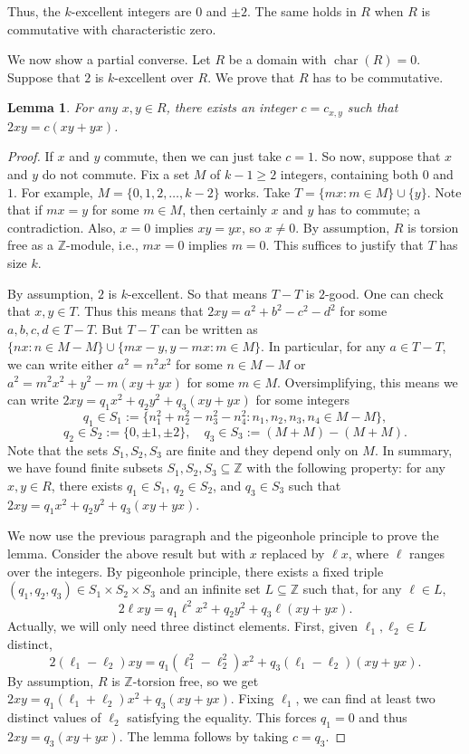 \documentclass{article}
\newcommand{\Z}{\mathbb{Z}}
\DeclareMathOperator{\rchar}{char}
\newtheorem{lemma}{Lemma}
\begin{document}
Thus, the $k$-excellent integers are $0$ and $\pm 2$.
The same holds in $R$ when $R$ is commutative with characteristic zero.

We now show a partial converse.
Let $R$ be a domain with $\rchar(R) = 0$.
Suppose that $2$ is $k$-excellent over $R$.
We prove that $R$ has to be commutative.

\begin{lemma}\label{2017a2-6}
For any $x, y \in R$, there exists an integer $c = c_{x, y}$ such that $2xy = c(xy + yx)$.
\end{lemma}
\begin{proof}
If $x$ and $y$ commute, then we can just take $c = 1$.
So now, suppose that $x$ and $y$ do not commute.
Fix a set $M$ of $k - 1 \geq 2$ integers, containing both $0$ and $1$.
For example, $M = \{0, 1, 2, \ldots, k - 2\}$ works.
Take $T = \{mx : m \in M\} \cup \{y\}$.
Note that if $mx = y$ for some $m \in M$, then certainly $x$ and $y$ has to commute; a contradiction.
Also, $x = 0$ implies $xy = yx$, so $x \neq 0$.
By assumption, $R$ is torsion free as a $\Z$-module, i.e., $mx = 0$ implies $m = 0$.
This suffices to justify that $T$ has size $k$.

By assumption, $2$ is $k$-excellent.
So that means $T - T$ is $2$-good.
One can check that $x, y \in T$.
Thus this means that $2xy = a^2 + b^2 - c^2 - d^2$ for some $a, b, c, d \in T - T$.
But $T - T$ can be written as $\{nx : n \in M - M\} \cup \{mx - y, y - mx : m \in M\}$.
In particular, for any $a \in T - T$, we can write either $a^2 = n^2 x^2$ for some $n \in M - M$ or $a^2 = m^2 x^2 + y^2 - m(xy + yx)$ for some $m \in M$.
Oversimplifying, this means we can write $2xy = q_1 x^2 + q_2 y^2 + q_3 (xy + yx)$ for some integers
\[ q_1 \in S_1 := \{n_1^2 + n_2^2 - n_3^2 - n_4^2 : n_1, n_2, n_3, n_4 \in M - M\}, \]
\[ q_2 \in S_2 := \{0, \pm 1, \pm 2\}, \quad q_3 \in S_3 := (M + M) - (M + M). \]
Note that the sets $S_1, S_2, S_3$ are finite and they depend only on $M$.
In summary, we have found finite subsets $S_1, S_2, S_3 \subseteq \Z$ with the following property:
    for any $x, y \in R$, there exists $q_1 \in S_1$, $q_2 \in S_2$, and $q_3 \in S_3$ such that $2xy = q_1 x^2 + q_2 y^2 + q_3 (xy + yx)$.

We now use the previous paragraph and the pigeonhole principle to prove the lemma.
Consider the above result but with $x$ replaced by $\ell x$, where $\ell$ ranges over the integers.
By pigeonhole principle, there exists a fixed triple $(q_1, q_2, q_3) \in S_1 \times S_2 \times S_3$ and an infinite set $L \subseteq \Z$ such that, for any $\ell \in L$,
\[ 2 \ell xy = q_1 \ell^2 x^2 + q_2 y^2 + q_3 \ell (xy + yx). \]
Actually, we will only need three distinct elements.
First, given $\ell_1, \ell_2 \in L$ distinct,
\[ 2 (\ell_1 - \ell_2) xy = q_1 (\ell_1^2 - \ell_2^2) x^2 + q_3 (\ell_1 - \ell_2) (xy + yx). \]
By assumption, $R$ is $\Z$-torsion free, so we get $2xy = q_1 (\ell_1 + \ell_2) x^2 + q_3 (xy + yx)$.
Fixing $\ell_1$, we can find at least two distinct values of $\ell_2$ satisfying the equality.
This forces $q_1 = 0$ and thus $2xy = q_3 (xy + yx)$.
The lemma follows by taking $c = q_3$.
\end{proof}
\end{document}

